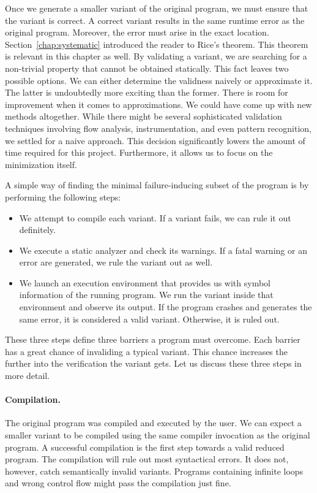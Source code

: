 Once we generate a smaller variant of the original program, we must ensure 
that the variant is correct. 
A correct variant results in the same runtime error as the original program. 
Moreover, the error must arise in the exact location. 
Section~\ref{chap:systematic} introduced the reader to Rice's theorem. 
This theorem is relevant in this chapter as well. 
By validating a variant, we are searching for a non-trivial property that 
cannot be obtained statically. 
This fact leaves two possible options. 
We can either determine the validness naively or approximate it. 
The latter is undoubtedly more exciting than the former. 
There is room for improvement when it comes to approximations. 
We could have come up with new methods altogether. 
While there might be several sophisticated validation techniques involving 
flow analysis, instrumentation, and even pattern recognition, we settled for 
a naive approach. 
This decision significantly lowers the amount of time required for this 
project. 
Furthermore, it allows us to focus on the minimization itself.

A simple way of finding the minimal failure-inducing subset of the program is 
by performing the following steps:
\begin{itemize}
  \item We attempt to compile each variant. 
  If a variant fails, we can rule it out definitely.
  \item We execute a static analyzer and check its warnings. 
  If a fatal warning or an error are generated, we rule the variant out as 
  well.
  \item We launch an execution environment that provides us with symbol 
  information of the running program. 
  We run the variant inside that environment and observe its output. 
  If the program crashes and generates the same error, it is considered 
  a valid variant. 
  Otherwise, it is ruled out.
\end{itemize}
These three steps define three barriers a program must overcome. 
Each barrier has a great chance of invaliding a typical variant. 
This chance increases the further into the verification the variant gets. 
Let us discuss these three steps in more detail.

\paragraph{Compilation.} The original program was compiled and executed by 
the user. 
We can expect a smaller variant to be compiled using the same compiler 
invocation as the original program. 
A successful compilation is the first step towards a valid reduced program. 
The compilation will rule out most syntactical errors. 
It does not, however, catch semantically invalid variants. 
Programs containing infinite loops and wrong control flow might pass 
the compilation just fine.

